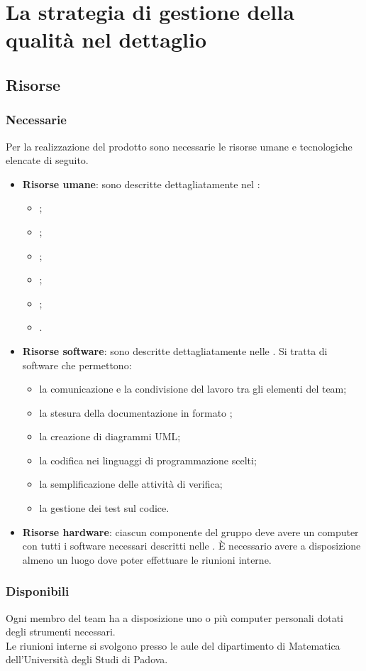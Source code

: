 \documentclass[../PianoDiQualifica.tex]{subfiles}
\begin{document}
	\section{La strategia di gestione della qualità nel dettaglio}
		\subsection{Risorse}
			\subsubsection{Necessarie}
				Per la realizzazione del prodotto sono necessarie le risorse
				umane e tecnologiche elencate di seguito.
				\begin{itemize}
					\item \textbf{Risorse umane}: sono descritte
					dettagliatamente nel \pianodiprogettov:
					\begin{itemize}
						\item \responsabilediprogetto;
						\item \amministratore;
						\item \analista;
						\item \progettista;
						\item \programmatore;
						\item \verificatore.
					\end{itemize}
					\item \textbf{Risorse software}: sono descritte
					dettagliatamente nelle \normediprogettov. Si tratta di
					software che permettono:
					\begin{itemize}
						\item la comunicazione e la condivisione del lavoro
						tra gli elementi del team;
						\item la stesura della documentazione in
						formato \gl{\LaTeX};
						\item la creazione di diagrammi UML;
						\item la codifica nei linguaggi di programmazione scelti;
						\item la semplificazione delle attività di verifica;
						\item la gestione dei test sul codice.
					\end{itemize}
					\item \textbf{Risorse hardware}: ciascun componente del
					gruppo deve avere un computer con tutti i software necessari
					descritti nelle \normediprogettov. È necessario avere a
					disposizione almeno un luogo dove poter effettuare le
					riunioni interne.
				\end{itemize}
			\subsubsection{Disponibili}
				Ogni membro del team ha a disposizione uno o più computer
				personali dotati degli strumenti necessari.\\
				Le riunioni interne si svolgono presso le aule del dipartimento
				di Matematica dell'Università degli Studi di Padova.
\end{document}
